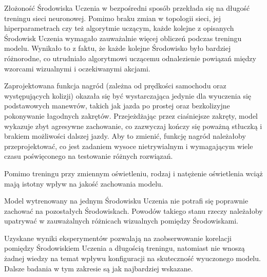 \begin{enumerate*}
\item Złożoność Środowiska Uczenia w bezpośredni sposób przekłada się na długość treningu sieci neuronowej. Pomimo braku zmian w topologii sieci, jej hiperparametrach czy też algorytmie uczącym, każde kolejne z opisanych Środowisk Uczenia wymagało zauważalnie więcej obliczeń podczas treningu modelu. Wynikało to z faktu, że każde kolejne Środowisko było bardziej różnorodne, co utrudniało algorytmowi uczącemu odnalezienie powiązań między wzorcami wizualnymi i oczekiwanymi akcjami.
\item Zaprojektowana funkcja nagród (zależna od prędkości samochodu oraz występujących kolizji) okazała się być wystarczająca jedynie dla wyuczenia się podstawowych manewrów, takich jak jazda po prostej oraz bezkolizyjne pokonywanie łagodnych zakrętów. Przejeżdżając przez ciaśniejsze zakręty, model wykazuje zbyt agresywne zachowanie, co zazwyczaj kończy się poważną stłuczką i brakiem możliwości dalszej jazdy. Aby to zmienić, funkcję nagród należałoby przeprojektować, co jest zadaniem wysoce nietrywialnym i wymagającym wiele czasu poświęconego na testowanie różnych rozwiązań.
\item Pomimo treningu przy zmiennym oświetleniu, rodzaj i natężenie oświetlenia wciąż mają istotny wpływ na jakość zachowania modelu.
\item Model wytrenowany na jednym Środowisku Uczenia nie potrafi się poprawnie zachować na pozostałych Środowiskach. Powodów takiego stanu rzeczy należałoby upatrywać w zauważalnych różnicach wizualnych pomiędzy Środowiskami.
\item Uzyskane wyniki eksperymentów pozwalają na zaobserwowanie korelacji pomiędzy Środowiskiem Uczenia a długością treningu, natomiast nie wnoszą żadnej wiedzy na temat wpływu konfiguracji na skuteczność wyuczonego modelu. Dalsze badania w tym zakresie są jak najbardziej wskazane.
\end{enumerate*}